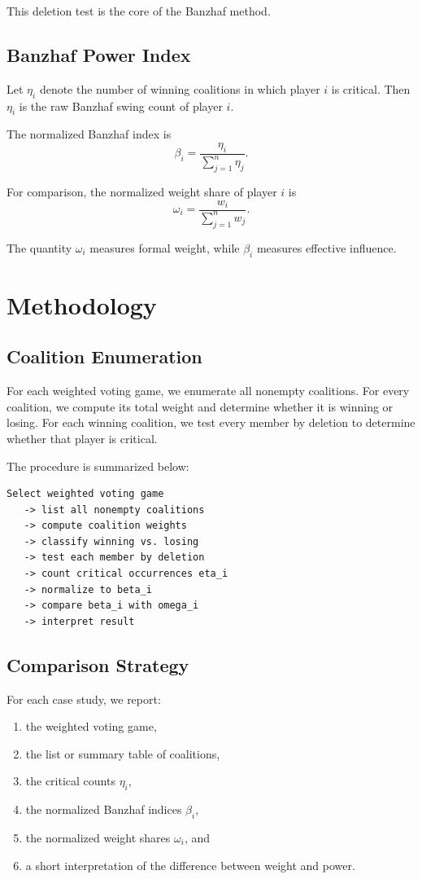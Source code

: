 \documentclass[lettersize,journal]{IEEEtran}
\begin{document}
This deletion test is the core of the Banzhaf method.

\subsection{Banzhaf Power Index}
Let $\eta_i$ denote the number of winning coalitions in which player $i$ is critical. Then $\eta_i$ is the raw Banzhaf swing count of player $i$.

The normalized Banzhaf index is
\begin{equation}
\beta_i=\frac{\eta_i}{\sum_{j=1}^n \eta_j}.
\end{equation}

For comparison, the normalized weight share of player $i$ is
\begin{equation}
\omega_i=\frac{w_i}{\sum_{j=1}^n w_j}.
\end{equation}

The quantity $\omega_i$ measures formal weight, while $\beta_i$ measures effective influence.

\section{Methodology}

\subsection{Coalition Enumeration}
For each weighted voting game, we enumerate all nonempty coalitions. For every coalition, we compute its total weight and determine whether it is winning or losing. For each winning coalition, we test every member by deletion to determine whether that player is critical.

The procedure is summarized below:
\begin{verbatim}
Select weighted voting game
   -> list all nonempty coalitions
   -> compute coalition weights
   -> classify winning vs. losing
   -> test each member by deletion
   -> count critical occurrences eta_i
   -> normalize to beta_i
   -> compare beta_i with omega_i
   -> interpret result
\end{verbatim}

\subsection{Comparison Strategy}
For each case study, we report:
\begin{enumerate}
    \item the weighted voting game,
    \item the list or summary table of coalitions,
    \item the critical counts $\eta_i$,
    \item the normalized Banzhaf indices $\beta_i$,
    \item the normalized weight shares $\omega_i$, and
    \item a short interpretation of the difference between weight and power.
\end{enumerate}
\end{document}
